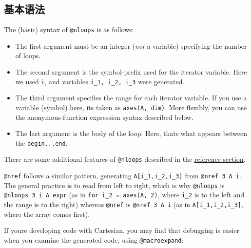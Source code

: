\hypertarget{3961768779038303546}{}


\subsection{基本语法}



The (basic) syntax of \texttt{@nloops} is as follows:



\begin{itemize}
\item The first argument must be an integer (\emph{not} a variable) specifying the number of loops.


\item The second argument is the symbol-prefix used for the iterator variable. Here we used \texttt{i}, and variables \texttt{i\_1, i\_2, i\_3} were generated.


\item The third argument specifies the range for each iterator variable. If you use a variable (symbol) here, it{\textquotesingle}s taken as \texttt{axes(A, dim)}. More flexibly, you can use the anonymous-function expression syntax described below.


\item The last argument is the body of the loop. Here, that{\textquotesingle}s what appears between the \texttt{begin...end}.

\end{itemize}


There are some additional features of \texttt{@nloops} described in the \hyperlink{6401299442402093832}{reference section}.



\texttt{@nref} follows a similar pattern, generating \texttt{A[i\_1,i\_2,i\_3]} from \texttt{@nref 3 A i}. The general practice is to read from left to right, which is why \texttt{@nloops} is \texttt{@nloops 3 i A expr} (as in \texttt{for i\_2 = axes(A, 2)}, where \texttt{i\_2} is to the left and the range is to the right) whereas \texttt{@nref} is \texttt{@nref 3 A i} (as in \texttt{A[i\_1,i\_2,i\_3]}, where the array comes first).



If you{\textquotesingle}re developing code with Cartesian, you may find that debugging is easier when you examine the generated code, using \texttt{@macroexpand}:






